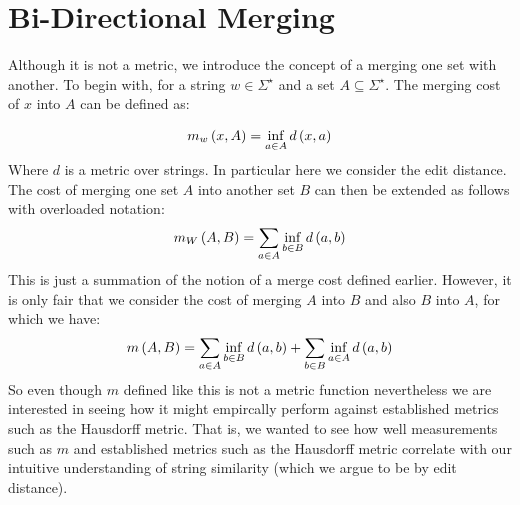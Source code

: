 
\section{Bi-Directional Merging}

Although it is not a metric, we introduce the concept of a merging one
set with another.
To begin with, for a string \(w \in \Sigma^\star\)
and a set \(A \subseteq \Sigma^\star\).
The merging cost of \(x\) into \(A\) can be defined as:

\begin{align*}
  m_w \left(x, A\right) = \inf_{a \in A} d\left(x, a\right)
\end{align*}
Where \(d\) is a metric over strings.
In particular here we consider the edit distance.
The cost of merging one set \(A\)
into another set \(B\) can then be extended as follows
with overloaded notation:
\begin{align*}
  m_W \left(A, B\right) = \sum_{a \in A} \inf_{b \in B} d\left(a, b\right)
\end{align*}
This is just a summation of the notion of a merge cost defined earlier.
However, it is only fair that we consider the cost of merging \(A\) into \(B\)
and also \(B\) into \(A\), for which we have:
\begin{align*}
  m \left(A, B\right) =
      \sum_{a \in A} \inf_{b \in B} d\left(a, b\right) +
      \sum_{b \in B} \inf_{a \in A} d\left(a, b\right)
\end{align*}
So even though \(m\) defined like this is not a metric function
nevertheless we are interested in seeing how it might empircally perform
against established metrics such as the Hausdorff metric.
That is, we wanted to see how well measurements such as \(m\)
and established metrics such as the Hausdorff metric
correlate with our intuitive understanding of string similarity
(which we argue to be by edit distance).



